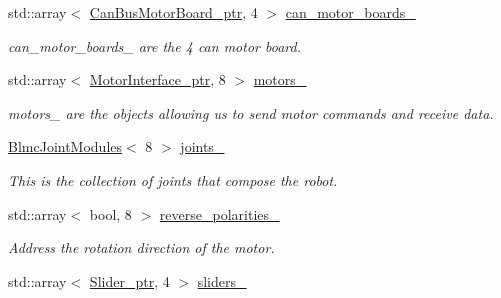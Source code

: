 \begin{DoxyCompactItemize}
std\+::array$<$ \hyperlink{common__header_8hpp_aab1c6ddb1273247a1b45d5e8b417c216}{Can\+Bus\+Motor\+Board\+\_\+ptr}, 4 $>$ \hyperlink{classblmc__robots_1_1Solo8TI_aa436a497b597b05b0733430ea5c2f251}{can\+\_\+motor\+\_\+boards\+\_\+}
\begin{DoxyCompactList}\small\item\em can\+\_\+motor\+\_\+boards\+\_\+ are the 4 can motor board. \end{DoxyCompactList}\item 
\mbox{\label{classblmc__robots_1_1Solo8TI_a369f7f53f6bb02e325616ebcf9a4fd88}} 
std\+::array$<$ \hyperlink{common__header_8hpp_ae1a0f9992bc8fbbc1943d887f517c180}{Motor\+Interface\+\_\+ptr}, 8 $>$ \hyperlink{classblmc__robots_1_1Solo8TI_a369f7f53f6bb02e325616ebcf9a4fd88}{motors\+\_\+}
\begin{DoxyCompactList}\small\item\em motors\+\_\+ are the objects allowing us to send motor commands and receive data. \end{DoxyCompactList}\item 
\mbox{\label{classblmc__robots_1_1Solo8TI_ab1b54a7f74cfda8bd537d0adfc21166c}} 
\hyperlink{classblmc__robots_1_1BlmcJointModules}{Blmc\+Joint\+Modules}$<$ 8 $>$ \hyperlink{classblmc__robots_1_1Solo8TI_ab1b54a7f74cfda8bd537d0adfc21166c}{joints\+\_\+}
\begin{DoxyCompactList}\small\item\em This is the collection of joints that compose the robot. \end{DoxyCompactList}\item 
\mbox{\label{classblmc__robots_1_1Solo8TI_ab706eca1708afb98625a50c8347fd3d3}} 
std\+::array$<$ bool, 8 $>$ \hyperlink{classblmc__robots_1_1Solo8TI_ab706eca1708afb98625a50c8347fd3d3}{reverse\+\_\+polarities\+\_\+}
\begin{DoxyCompactList}\small\item\em Address the rotation direction of the motor. \end{DoxyCompactList}\item 
\mbox{\label{classblmc__robots_1_1Solo8TI_ae4f93fdbb8c382e5b317e471f9c7c429}} 
std\+::array$<$ \hyperlink{common__header_8hpp_a4cb9a95e8b2c0bf237ce29f5252c7b73}{Slider\+\_\+ptr}, 4 $>$ \hyperlink{classblmc__robots_1_1Solo8TI_ae4f93fdbb8c382e5b317e471f9c7c429}{sliders\+\_\+}

\end{DoxyCompactItemize}
